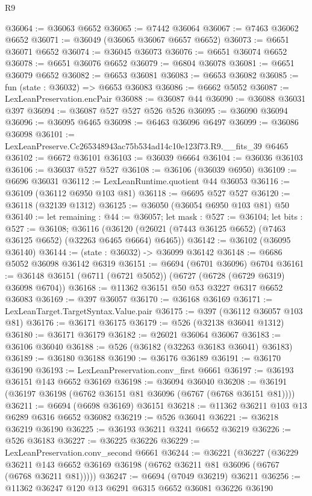 \begin{lexlean}{R9}
\begin{coremodule}
@36064 := @36063 @6652
@36065 := @7442 @36064
@36067 := @7463 @36062 @6652
@36071 := @36049 (@36065 @36067 @6657 @6652)
@36073 := @6651 @36071 @6652
@36074 := @36045 @36073
@36076 := @6651 @36074 @6652
@36078 := @6651 @36076 @6652
@36079 := @6804 @36078
@36081 := @6651 @36079 @6652
@36082 := @6653 @36081
@36083 := @6653 @36082
@36085 := fun (state : @36032) => @6653 @36083
@36086 := @6662 @5052
@36087 := LexLeanPreservation.encPair
@36088 := @36087 @44
@36090 := @36088 @36031 @397
@36094 := @36087 @527 @527 @526 @526
@36095 := @36090 @36094
@36096 := @36095 @6465
@36098 := @6463 @36096 @6497
@36099 := @36086 @36098
@36101 := LexLeanPreserve.Cc265348943ac75b534ad14c10e123f73.R9.__fits_39 @6465
@36102 := @6672 @36101
@36103 := @36039 @6664
@36104 := @36036 @36103
@36106 := @36037 @527 @527
@36108 := @36106 (@36039 @6950)
@36109 := @6696 @36031
@36112 := LexLeanRuntime.quotient @44 @36053
@36116 := @36109 (@36112 @6950 @103 @81)
@36118 := @6695 @527 @527
@36120 := @36118 (@32139 @1312)
@36125 := @36050 (@36054 @6950 @103 @81) @50
@36140 := let remaining : @44 := @36057;
  let mask : @527 := @36104;
  let bits : @527 := @36108;
  @36116 (@36120 (@26021 (@7443 @36125 @6652) (@7463 @36125 @6652) (@32263 @6465 @6664) @6465))
@36142 := @36102 (@36095 @36140)
@36144 := (state : @36032) -> @36099 @36142
@36148 := @6686 @5052 @36098 @36142 @6319
@36151 := @6694 (@6701 @36096) @6704
@36161 := @36148 @36151 (@6711 (@6721 @5052)) (@6727 (@6728 (@6729 @6319) @36098 @6704))
@36168 := @11362 @36151 @50 @53 @3227 @6317 @6652 @36083
@36169 := @397 @36057
@36170 := @36168 @36169
@36171 := LexLeanTarget.TargetSyntax.Value.pair
@36175 := @397 (@36112 @36057 @103 @81)
@36176 := @36171 @36175
@36179 := @526 (@32138 @36041 @1312)
@36180 := @36171 @36179
@36182 := @26021 @36064 @36067
@36183 := @36106 @36040
@36188 := @526 (@36182 (@32263 @36183 @36041) @36183)
@36189 := @36180 @36188
@36190 := @36176 @36189
@36191 := @36170 @36190
@36193 := LexLeanPreservation.conv_first @6661
@36197 := @36193 @36151 @143 @6652 @36169
@36198 := @36094 @36040
@36208 := @36191 (@36197 @36198 (@6762 @36151 @81 @36096 (@6767 (@6768 @36151 @81))))
@36211 := @6694 (@6698 @36169) @36151
@36218 := @11362 @36211 @103 @13 @6289 @6316 @6652 @36082
@36219 := @526 @36041
@36221 := @36218 @36219 @36190
@36225 := @36193 @36211 @3241 @6652 @36219
@36226 := @526 @36183
@36227 := @36225 @36226
@36229 := LexLeanPreservation.conv_second @6661
@36244 := @36221
    (@36227
      (@36229 @36211 @143 @6652 @36169 @36198 (@6762 @36211 @81 @36096 (@6767 (@6768 @36211 @81)))))
@36247 := @6694 (@7049 @36219) @36211
@36256 := @11362 @36247 @120 @13 @6291 @6315 @6652 @36081 @36226 @36190

\end{coremodule}
\end{lexlean}
